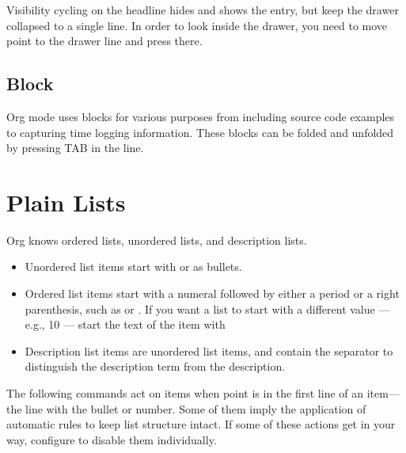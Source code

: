 Visibility cycling on the headline hides and shows the entry, but keep the drawer collapsed to a single line.
In order to look inside the drawer, you need to move point to the drawer line and press  there.

\subsection{Block}
\label{sec:block}

Org mode uses  blocks for various purposes from including source code examples to capturing time logging information.
These blocks can be folded and unfolded by pressing TAB in the  line. 

\section{Plain Lists}
\label{sec:plain-lists}

Org knows ordered lists, unordered lists, and description lists.
\begin{itemize}
\item Unordered list items start with \keyword{-, + } or \keyword{*} as bullets.
\item Ordered list items start with a numeral followed by either a period or a right parenthesis, such as  or . If you want a list to start with a different value — e.g., 10 — start the text of the item with \keyword{[@10]}
\item Description list items are unordered list items, and contain the separator \keyword{::} to distinguish the description term from the description.
\end{itemize}

The following commands act on items when point is in the first line of an item—the line with the bullet or number.
Some of them imply the application of automatic rules to keep list structure intact.
If some of these actions get in your way, configure  to disable them individually.



